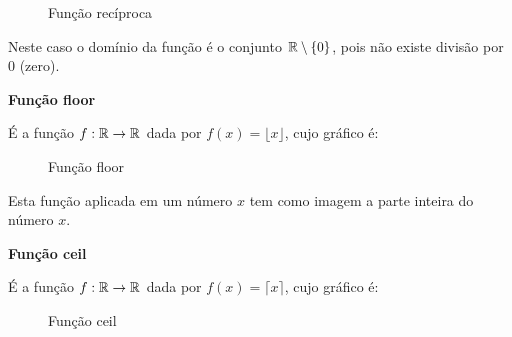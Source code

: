    \begin{figure}[H]
 \centering
    \caption{Função recíproca}
  \end{figure}

  Neste caso o domínio da função é o conjunto $\mathbb{R} \setminus \{0\}$, pois não existe divisão por $0$ (zero).

  \newpage

  \textbf{Função floor}

  É a função $f: \mathbb{R} \to \mathbb{R}$ dada por $f(x)= \lfloor {x} \rfloor$, cujo gráfico é:

   \begin{figure}[H]
 \centering
    \caption{Função floor}
  \end{figure}

  Esta função aplicada em um número $x$ tem como imagem a parte inteira do número $x$.

  \textbf{Função ceil}

  É a função $f: \mathbb{R} \to \mathbb{R}$ dada por $f(x)= \lceil {x} \rceil$, cujo gráfico é:

   \begin{figure}[H]
 \centering
    \caption{Função ceil}
  \end{figure}


